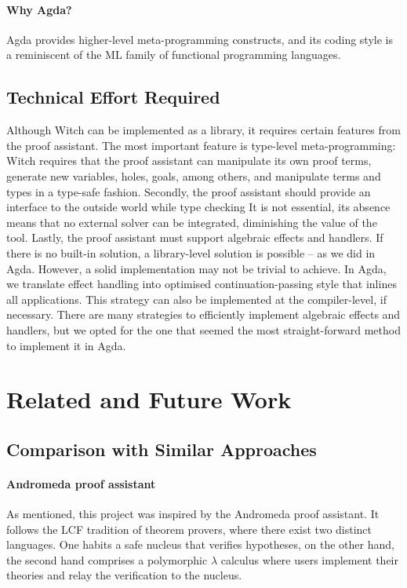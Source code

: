 \documentclass[sigconfl]{acmart}
\begin{document}
\paragraph{Why Agda?} Agda provides higher-level meta-programming constructs, and
its coding style is a reminiscent of the ML family of functional programming languages.

\subsection{Technical Effort Required} \label{tech-details}

Although Witch can be implemented as a library, it requires certain features
from the proof assistant. The most important feature is type-level
meta-programming: Witch requires that the proof assistant can manipulate its own
proof terms, generate new variables, holes, goals, among others, and manipulate
terms and types in a type-safe fashion.
Secondly, the proof assistant should provide an interface to the outside world
while type checking
It is not essential, its absence means that no external solver can be
integrated, diminishing the value of the tool.
Lastly, the proof assistant must support algebraic effects and handlers. If there
is no built-in solution, a library-level solution is possible -- as we did in
Agda. However, a solid implementation may not be trivial to achieve. In Agda,
we translate effect handling into optimised continuation-passing style that inlines
all applications. This strategy can also be implemented at the compiler-level,
if necessary. There are many strategies to efficiently implement algebraic
effects and handlers, but we opted for the one that seemed the most
straight-forward method to implement it in Agda.

\section{Related and Future Work}

\subsection{Comparison with Similar Approaches}

\paragraph{Andromeda proof assistant} As mentioned, this project was inspired by the
Andromeda proof assistant. It follows the LCF tradition of theorem provers,
where there exist two distinct languages. One habits a safe nucleus that
verifies hypotheses, on the other hand, the second hand comprises a polymorphic
$\lambda$ calculus where users implement their theories and relay the
verification to the nucleus.
\end{document}

